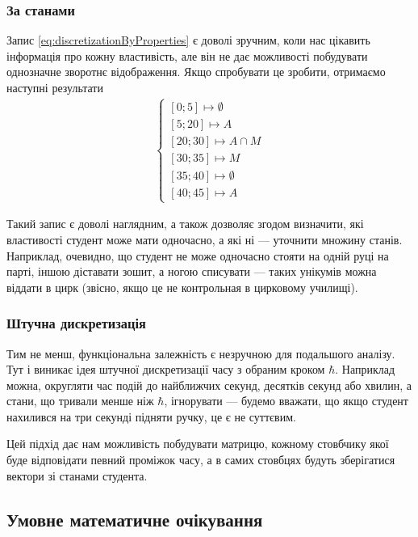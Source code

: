 \subsubsection{За станами}

Запис \eqref{eq:discretizationByProperties} є доволі зручним, коли нас цікавить
інформація про кожну властивість, але він не дає можливості побудувати
однозначне зворотнє відображення.
Якщо спробувати це зробити, отримаємо наступні результати
\begin{align}\label{eq:timeToStateMapsExample}
  \begin{cases}
    \left[ 0; 5 \right] \mapsto \emptyset \\
    \left[ 5; 20 \right] \mapsto A \\
    \left[ 20; 30 \right] \mapsto A \cap M \\
    \left[ 30; 35 \right] \mapsto M \\
    \left[ 35; 40 \right] \mapsto \emptyset \\
    \left[ 40; 45 \right] \mapsto A
  \end{cases}
\end{align}

Такий запис є доволі наглядним, а також дозволяє згодом визначити, які
властивості студент може мати одночасно, а які ні --- уточнити множину станів.
Наприклад, очевидно, що студент не може одночасно стояти на одній руці на парті,
іншою діставати зошит, а ногою списувати --- таких унікумів можна віддати в цирк
(звісно, якщо це не контрольная в цирковому училищі).

\subsubsection{Штучна дискретизація}

Тим не менш, функціональна залежність є незручною для подальшого аналізу.
Тут і виникає ідея штучної дискретизації часу з обраним кроком $\hbar$.
Наприклад можна, округляти час подій до найближчих секунд, десятків секунд або
хвилин, а стани, що тривали менше ніж $\hbar$, ігнорувати --- будемо вважати,
що якщо студент нахилився на три секунді підняти ручку, це є не суттєвим.

Цей підхід дає нам можливість побудувати матрицю, кожному стовбчику якої буде
відповідати певний проміжок часу, а в самих стовбцях будуть зберігатися вектори
зі станами студента.

\subsection{Умовне математичне очікування}

